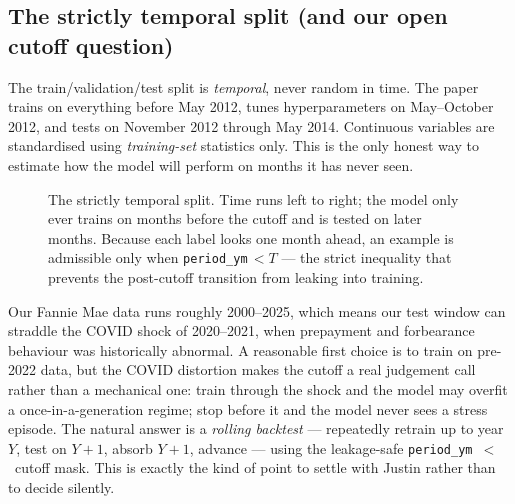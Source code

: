 \documentclass[11pt]{article}
\begin{document}
\subsection{The strictly temporal split (and our open cutoff question)}

\begin{keyidea}
The train/validation/test split is \emph{temporal}, never random in time. The paper trains
on everything before May 2012, tunes hyperparameters on May--October 2012, and tests on
November 2012 through May 2014. Continuous variables are standardised using
\emph{training-set} statistics only. This is the only honest way to estimate how the model
will perform on months it has never seen.
\end{keyidea}

\begin{figure}[H]
\centering
{}
\caption{The strictly temporal split. Time runs left to right; the model only ever trains on
months before the cutoff and is tested on later months. Because each label looks one month
ahead, an example is admissible only when \texttt{period\_ym}$\,<T$ --- the strict inequality
that prevents the post-cutoff transition from leaking into training.}
\end{figure}

\begin{intuition}
Our Fannie Mae data runs roughly 2000--2025, which means our test window can straddle the
COVID shock of 2020--2021, when prepayment and forbearance behaviour was historically
abnormal. A reasonable first choice is to train on pre-2022 data, but the COVID distortion
makes the cutoff a real judgement call rather than a mechanical one: train through the shock
and the model may overfit a once-in-a-generation regime; stop before it and the model never
sees a stress episode. The natural answer is a \emph{rolling backtest} --- repeatedly
retrain up to year $Y$, test on $Y{+}1$, absorb $Y{+}1$, advance --- using the leakage-safe
\texttt{period\_ym}~$<$~cutoff mask. This is exactly the kind of point to settle with Justin
rather than to decide silently.
\end{intuition}
\end{document}
